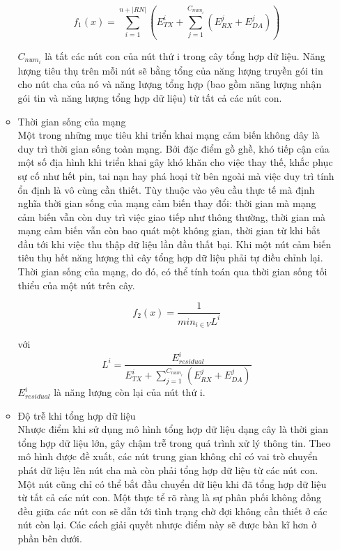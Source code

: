 \documentclass{hust}
\begin{document}
\begin{itemize}
\begin{itemize}
		\begin{equation}
		f_1(x) = \sum_{i=1}^{n + |RN|} (E^i_{TX} + \sum_{j=1}^{C_{num_i}} (E_{RX}^j + E_{DA}^j))
		\end{equation}
		
		$C_{num_i}$ là tất các nút con của nút thứ i trong cây tổng hợp dữ liệu. Năng lượng tiêu thụ trên mỗi nút sẽ bằng tổng của năng lượng truyền gói tin cho nút cha của nó và năng lượng tổng hợp (bao gồm năng lượng nhận gói tin và năng lượng tổng hợp dữ liệu) từ tất cả các nút con.
		
		\item{Thời gian sống của mạng} \\
		Một trong những mục tiêu khi triển khai mạng cảm biến không dây là duy trì thời gian sống toàn mạng. Bởi đặc điểm gồ ghề, khó tiếp cận của một số địa hình khi triển khai gây khó khăn cho việc thay thế, khắc phục sự cố như hết pin, tai nạn hay phá hoại từ bên ngoài mà việc duy trì tính ổn định là vô cùng cần thiết. Tùy thuộc vào yêu cầu thực tế mà định nghĩa thời gian sống của mạng cảm biến thay đổi: thời gian mà mạng cảm biến vẫn còn duy trì việc giao tiếp như thông thường, thời gian mà mạng cảm biến vẫn còn bao quát một không gian, thời gian từ khi bắt đầu tới khi việc thu thập dữ liệu lần đầu thất bại. Khi một nút cảm biến tiêu thụ hết năng lượng thì cây tổng hợp dữ liệu phải tự điều chỉnh lại. Thời gian sống của mạng, do đó, có thể tính toán qua thời gian sống tối thiểu của một nút trên cây.
		
		\begin{equation}
		f_2(x) = \frac{1}{min_{i \in V}  L^i}
		\end{equation}
		
		với
		\begin{equation}
		L^i = \frac{E^i_{residual}}{E^i_{TX} + \sum_{j=1}^{C_{num_i}} (E_{RX}^j + E_{DA}^j)}
		\end{equation}
		$E^i_{residual}$ là năng lượng còn lại của nút thứ i.
		
		\item{Độ trễ khi tổng hợp dữ liệu} \\
		Nhược điểm khi sử dụng mô hình tổng hợp dữ liệu dạng cây là thời gian tổng hợp dữ liệu lớn, gây chậm trễ trong quá trình xử lý thông tin. Theo mô hình được đề xuất, các nút trung gian không chỉ có vai trò chuyển phát dữ liệu lên nút cha mà còn phải tổng hợp dữ liệu từ các nút con. Một nút cũng chỉ có thể bắt đầu chuyển dữ liệu khi đã tổng hợp dữ liệu từ tất cả các nút con. Một thực tể rõ ràng là sự phân phối không đồng đều giữa các nút con sẽ dẫn tới tình trạng chờ đợi không cần thiết ở các nút còn lại. Các cách giải quyết nhược điểm này sẽ được bàn kĩ hơn ở phần bên dưới.
		

\end{itemize}
\end{itemize}
\end{document}
